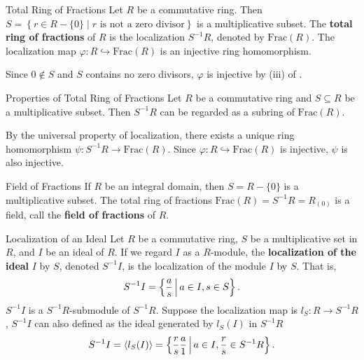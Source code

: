 \begin{definition}{Total Ring of Fractions}{}
    Let $R$ be a commutative ring. Then $S=\left\{r\in R-\{0\}\mid r\text{ is not a zero divisor}\right\}$ is a multiplicative subset. The \textbf{total ring of fractions} of $R$ is the localization $S^{-1}R$, denoted by $\mathrm{Frac}(R)$. The localization map $\varphi:R\hookrightarrow \mathrm{Frac}(R)$ is an injective ring homomorphism.
\end{definition}

\begin{prf}
    Since $0\notin S$ and $S$ contains no zero divisors, $\varphi$ is injective by (iii) of .
\end{prf}

\begin{proposition}{Properties of Total Ring of Fractions}{}
    Let $R$ be a commutative ring and $S\subseteq R$ be a multiplicative subset. Then $S^{-1}R$ can be regarded as a subring of $\mathrm{Frac}(R)$. 
\end{proposition}

\begin{prf}
    By the universal property of localization, there exists a unique ring homomorphism $\psi:S^{-1}R\to \mathrm{Frac}(R)$. Since $\varphi:R\hookrightarrow \mathrm{Frac}(R)$ is injective, $\psi$ is also injective.
\end{prf}

\begin{definition}{Field of Fractions}{}
    If $R$ be an integral domain, then $S=R-\{0\}$ is a multiplicative subset. The total ring of fractions $\mathrm{Frac}(R)=S^{-1}R=R_{(0)}$ is a field, call the \textbf{field of fractions} of $R$.
\end{definition}


\begin{definition}{Localization of an Ideal}{}
    Let $R$ be a commutative ring, $S$ be a multiplicative set in $R$, and $I$ be an ideal of $R$. If we regard $I$ as a $R$-module, the \textbf{localization of the ideal} $I$ by $S$, denoted $S^{-1}I$, is the localization of the module $I$ by $S$. That is,
    \[
        S^{-1}I=\left\{\frac{a}{s}\,\middle\vert\, a\in I, s\in S\right\}.
    \]
    $S^{-1}I$ is a $S^{-1}R$-submodule of $S^{-1}R$. Suppose the localization map is $l_S:R\to S^{-1}R$, $S^{-1}I$ can also defined as the ideal generated by $l_S(I)$ in $S^{-1}R$
    \[
        S^{-1}I=\langle l_S(I)\rangle=\left\{\frac{r}{s}\frac{a}{1}\,\middle\vert\, a\in I, \frac{r}{s}\in S^{-1}R\right\}.
    \]
\end{definition}

